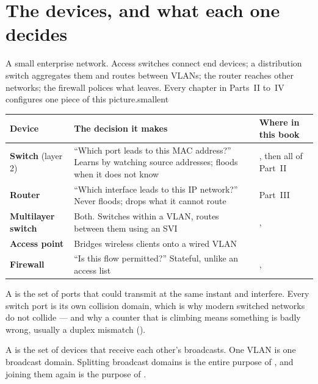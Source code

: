 \section{The devices, and what each one decides}

%
{A small enterprise network. Access switches connect end devices; a distribution
switch aggregates them and routes between VLANs; the router reaches other
networks; the firewall polices what leaves. Every chapter in Parts~II to~IV
configures one piece of this picture.}{smallent}

\begin{longtable}{@{}L{3.2cm}L{5.6cm}L{6.0cm}@{}}
\toprule
{}
\textbf{Device} & \textbf{The decision it makes} & \textbf{Where in this book} \\
\midrule
\endhead
\textbf{Switch} (layer 2) & ``Which port leads to this MAC address?'' Learns by
watching source addresses; floods when it does not know &
, then all of Part~II \\
\textbf{Router} & ``Which interface leads to this IP network?'' Never floods;
drops what it cannot route & Part~III \\
\textbf{Multilayer switch} & Both. Switches within a VLAN, routes between them
using an SVI & ,  \\
\textbf{Access point} & Bridges wireless clients onto a wired VLAN &
 \\
\textbf{Firewall} & ``Is this flow permitted?'' Stateful, unlike an access list &
,  \\
\bottomrule
\end{longtable}

\begin{definitionbox}
A  is the set of ports that could transmit at the same
instant and interfere. Every switch port is its own collision domain, which is
why modern switched networks do not collide --- and why a 
counter that is climbing means something is badly wrong, usually a duplex
mismatch ().

A  is the set of devices that receive each other's
broadcasts. One VLAN is one broadcast domain. Splitting broadcast domains is the
entire purpose of , and joining them again is the purpose of
.
\end{definitionbox}

